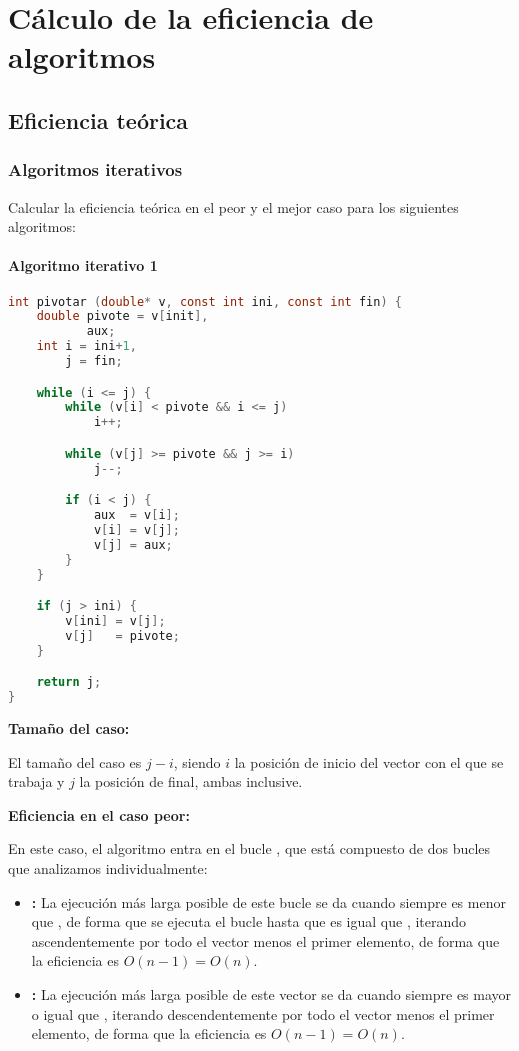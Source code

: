 \chapter{Cálculo de la eficiencia de algoritmos}\label{eficiencia}

\section{Eficiencia teórica}\label{eficiencia-teorica}

\subsection{Algoritmos iterativos}\label{eficiencia-teorica-iterativos}

Calcular la eficiencia teórica en el peor y el mejor caso para los siguientes algoritmos:

\subsubsection{Algoritmo iterativo 1}

\begin{lstlisting}[language=C]
int pivotar (double* v, const int ini, const int fin) {
	double pivote = v[init],
	       aux;
	int i = ini+1,
	    j = fin;

	while (i <= j) {
		while (v[i] < pivote && i <= j)
			i++;

		while (v[j] >= pivote && j >= i)
			j--;

		if (i < j) {
			aux  = v[i];
			v[i] = v[j];
			v[j] = aux;
		}
	}

	if (j > ini) {
		v[ini] = v[j];
		v[j]   = pivote;
	}

	return j;
}
\end{lstlisting}

\textbf{Tamaño del caso:}

El tamaño del caso es $j-i$, siendo $i$ la posición de inicio del vector con el que se trabaja y $j$ la posición de final, ambas inclusive.

\textbf{Eficiencia en el caso peor:}

En este caso, el algoritmo entra en el bucle , que está compuesto de dos bucles que analizamos individualmente:

\begin{itemize}
	\item{}\textbf{:} La ejecución más larga posible de este bucle se da cuando  siempre es menor que , de forma que se ejecuta el bucle hasta que  es igual que , iterando ascendentemente por todo el vector menos el primer elemento, de forma que la eficiencia es $O(n-1)=O(n)$.
	\item{}\textbf{:} La ejecución más larga posible de este vector se da cuando  siempre es mayor o igual que , iterando descendentemente por todo el vector menos el primer elemento, de forma que la eficiencia es $O(n-1)=O(n)$.
\end{itemize}

